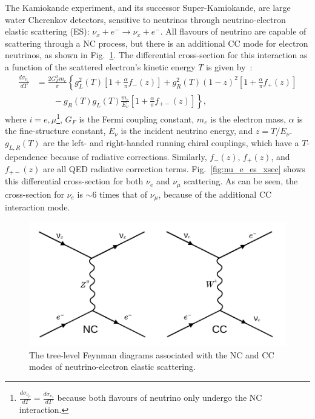The Kamiokande experiment, and its successor Super-Kamiokande, are large water Cherenkov detectors, sensitive to neutrinos through neutrino-electron elastic scattering (ES): $\nu_{x} + e^{-}\to\nu_{x} + e^{-}$. All flavours of neutrino are capable of scattering through a NC process, but there is an additional CC mode for electron neutrinos, as shown in Fig.~\ref{fig:nu_e_es_feynman_diagrams}. The differential cross-section for this interaction as a function of the scattered electron's kinetic energy $T$ is given by~\cite{bahcallSolarNeutrinosRadiative1995}: %
\begin{align}\label{eq:enu_es_xsec}
    \frac{d\sigma_{\nu_{i}}}{dT} &= \frac{2G_{F}^{2}m_{e}}{\pi}\left\{
        g_{L}^{2}(T)\left[
            1 + \frac{\alpha}{\pi}f_{-}(z)
        \right]
        + g_{R}^{2}(T)(1-z)^{2}\left[
            1 + \frac{\alpha}{\pi}f_{+}(z)
        \right]\right.\nonumber\\
        &\qquad \left. {}
        -g_{R}(T)g_{L}(T)\frac{m_{e}}{E_{\nu}}\left[
            1 + \frac{\alpha}{\pi}f_{+-}(z)
        \right]
    \right\},
\end{align}
where $i = e, \mu$\footnote{
    $\frac{d\sigma_{\nu_{\mu}}}{dT} = \frac{d\sigma_{\nu_{\tau}}}{dT}$ because both flavours of neutrino only undergo the NC interaction.
}, $G_{F}$ is the Fermi coupling constant, $m_{e}$ is the electron mass, $\alpha$ is the fine-structure constant, $E_{\nu}$ is the incident neutrino energy, and $z = T/E_{\nu}$. $g_{L,R}(T)$ are the left- and right-handed running chiral couplings, which have a $T$-dependence because of radiative corrections. Similarly, $f_{-}(z)$, $f_{+}(z)$, and $f_{+-}(z)$ are all QED radiative correction terms. Fig.~\ref{fig:nu_e_es_xsec} shows this differential cross-section for both $\nu_{e}$ and $\nu_{\mu}$ scattering. As can be seen, the cross-section for $\nu_{e}$ is $\sim 6$ times that of $\nu_{\mu}$, because of the additional CC interaction mode.

\begin{figure}
    \centering
    \includegraphics[width=\textwidth]{1_NeutrinoTheory/Figs/feynman_diag_nu_e_es.pdf}
    \caption[The two tree-level Feynman diagrams associated with neutrino-electron elastic scattering]
    {The tree-level Feynman diagrams associated with the NC and CC modes of neutrino-electron elastic scattering.}
    \label{fig:nu_e_es_feynman_diagrams}
\end{figure}

